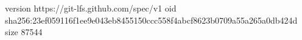 version https://git-lfs.github.com/spec/v1
oid sha256:23ef059116f1ee9e043eb8455150ccc558f4abcf8623b0709a55a265a0db424d
size 87544
